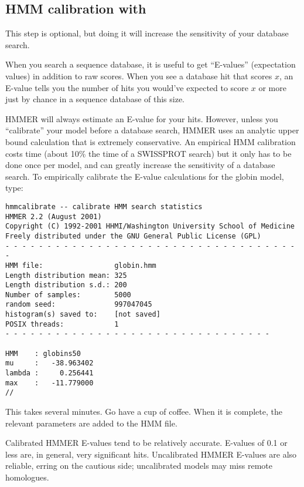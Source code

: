 \subsection{HMM calibration with }

This step is optional, but doing it will increase the sensitivity of
your database search.

When you search a sequence database, it is useful to get ``E-values''
(expectation values) in addition to raw scores. When you see a
database hit that scores $x$, an E-value tells you the number of hits
you would've expected to score $x$ or more just by chance in a
sequence database of this size. 

HMMER will always estimate an E-value for your hits. However, unless
you ``calibrate'' your model before a database search, HMMER uses an
analytic upper bound calculation that is extremely conservative.  An
empirical HMM calibration costs time (about 10\% the time of a
SWISSPROT search) but it only has to be done once per model, and can
greatly increase the sensitivity of a database search. To empirically
calibrate the E-value calculations for the globin model, type:

\vspace{1.5em}
\vspace{-1.5em}
{\small\begin{verbatim}
hmmcalibrate -- calibrate HMM search statistics
HMMER 2.2 (August 2001)
Copyright (C) 1992-2001 HHMI/Washington University School of Medicine
Freely distributed under the GNU General Public License (GPL)
- - - - - - - - - - - - - - - - - - - - - - - - - - - - - - - - - - - -
HMM file:                 globin.hmm
Length distribution mean: 325
Length distribution s.d.: 200
Number of samples:        5000
random seed:              997047045
histogram(s) saved to:    [not saved]
POSIX threads:            1
- - - - - - - - - - - - - - - - - - - - - - - - - - - - - - - -

HMM    : globins50
mu     :   -38.963402
lambda :     0.256441
max    :   -11.779000
//
\end{verbatim}}

This takes several minutes. Go have a cup of coffee. When it is
complete, the relevant parameters are added to the HMM file.

Calibrated HMMER E-values tend to be relatively accurate. E-values of
0.1 or less are, in general, very significant hits. Uncalibrated HMMER
E-values are also reliable, erring on the cautious side; uncalibrated
models may miss remote homologues.

